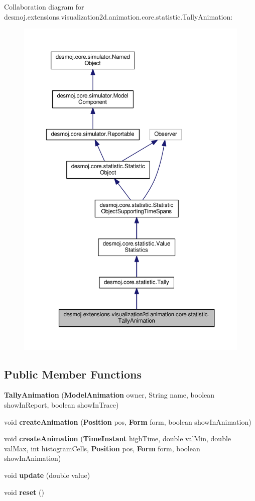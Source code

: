 Collaboration diagram for desmoj.\-extensions.\-visualization2d.\-animation.\-core.\-statistic.\-Tally\-Animation\-:
\nopagebreak
\begin{figure}[H]
\begin{center}
\leavevmode
\includegraphics[width=350pt]{classdesmoj_1_1extensions_1_1visualization2d_1_1animation_1_1core_1_1statistic_1_1_tally_animation__coll__graph}
\end{center}
\end{figure}
\subsection*{Public Member Functions}
\begin{DoxyCompactItemize}
\item 
{\bf Tally\-Animation} ({\bf Model\-Animation} owner, String name, boolean show\-In\-Report, boolean show\-In\-Trace)
\item 
void {\bf create\-Animation} ({\bf Position} pos, {\bf Form} form, boolean show\-In\-Animation)
\item 
void {\bf create\-Animation} ({\bf Time\-Instant} high\-Time, double val\-Min, double val\-Max, int histogram\-Cells, {\bf Position} pos, {\bf Form} form, boolean show\-In\-Animation)
\item 
void {\bf update} (double value)
\item 
void {\bfseries reset} ()\label{classdesmoj_1_1extensions_1_1visualization2d_1_1animation_1_1core_1_1statistic_1_1_tally_animation_a351df7985d8e19f36e3690dff2bb7e6a}

\end{DoxyCompactItemize}
